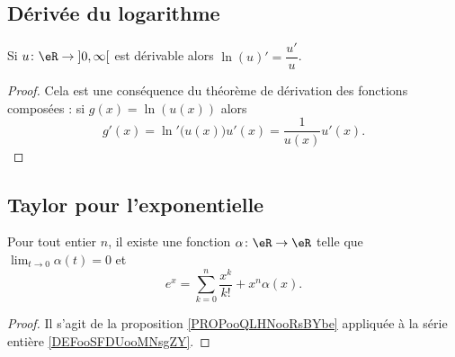 \subsection{Dérivée du logarithme}

\begin{lemma}       \label{LEMooTGCBooJdkLpg}
Si \( u\colon \eR\to \mathopen] 0 , \infty \mathclose[\) est dérivable alors \( \ln(u)'=\dfrac{ u' }{ u }\).
\end{lemma}

\begin{proof}
    Cela est une conséquence du théorème de dérivation des fonctions composées : si \( g(x)=\ln(u(x))\) alors
    \begin{equation}
        g'(x)=\ln'\big( u(x) \big)u'(x)=\frac{1}{ u(x) }u'(x).
    \end{equation}
\end{proof}

\subsection{Taylor pour l'exponentielle}

\begin{proposition}       \label{PROPooQBRGooAhGrvP}
    Pour tout entier \( n\), il existe une fonction \( \alpha\colon \eR\to \eR\) telle que \( \lim_{t\to 0} \alpha(t)=0\) et
    \begin{equation}
        e^x=\sum_{k=0}^n\frac{ x^k }{ k! }+x^n\alpha(x).
    \end{equation}
\end{proposition}

\begin{proof}
    Il s'agit de la proposition \ref{PROPooQLHNooRsBYbe} appliquée à la série entière \eqref{DEFooSFDUooMNsgZY}.
\end{proof}

